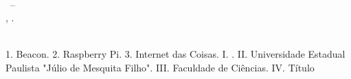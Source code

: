 \documentclass[
	12pt,				%
	openright,			%
	oneside,			%
	a4paper,			%
	chapter=TITLE,		%
	english,			%
	brazil				%
	]{abntex2}
\begin{document}
{\begin{fichacatalografica}
\begin{center}
{\begin{minipage}[c][8cm]{13.5cm}
	\hspace{0.5cm} \imprimirorientadorRotulo~\imprimirorientador\\
	
	\hspace{0.5cm}
	\parbox[t]{\textwidth}{\imprimirtipotrabalho~--~\\ \imprimirinstituicao,
	\imprimirdata.}\\
	
	\hspace{0.5cm}
		1. Beacon.
		2. Raspberry Pi.
		3. Internet das Coisas.
		I. \imprimirorientador.
		II. Universidade Estadual Paulista "Júlio de Mesquita Filho".
		III. Faculdade de Ciências.
		IV. Título
	\end{minipage}}
	\end{center}
  \end{fichacatalografica}
\fi









}
\end{document}
